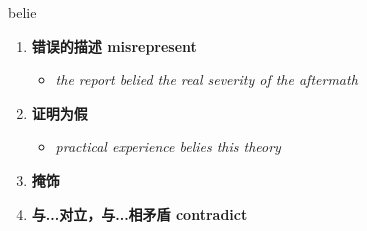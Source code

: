 
\begin{frame}
{\huge belie}
\begin{center}
\begin{enumerate}\Large
  \item \textbf{错误的描述 misrepresent}
  \begin{itemize}
    \item \em{\Large{the report belied the real severity of the aftermath}}
  \end{itemize}
  \item \textbf{证明为假}
  \begin{itemize}
    \item \em{\Large{practical experience belies this theory}}
  \end{itemize}
  \item \textbf{掩饰}
  \item \textbf{与...对立，与...相矛盾 contradict}
\end{enumerate}
\end{center}
\end{frame}
